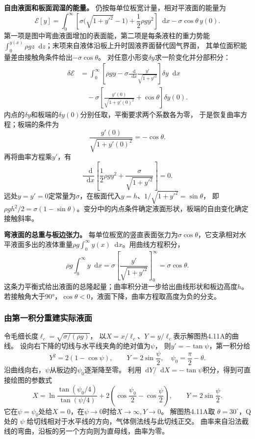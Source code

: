 \documentclass[UTF8,fontset=fandol,a4paper,11pt]{ctexart}
\newcommand{\dd}{\mathop{}\!\mathrm{d}}
\begin{document}
\textbf{自由液面和板面润湿的能量。} 仍按每单位板宽计量，相对平液面的能量为
\[
\mathcal E[y]=\int_0^\infty
\left[\sigma\bigl(\sqrt{1+y'^2}-1\bigr)+\frac12\rho gy^2\right]\dd x
-\sigma\cos\theta\,y(0).
\]
第一项是图中弯曲液面增加的表面能，第二项是每条液柱的重力势能
$\int_0^{y(x)}\rho gz\dd z$；末项来自液体沿板上升时固液界面替代固气界面，
其单位面积能量差由接触角条件给出$-\sigma\cos\theta$。
对任意小形变$\delta y$求一阶变化并分部积分：
\begin{align*}
\delta\mathcal E
&=\int_0^\infty\left[\rho gy-
\sigma\frac{\dd}{\dd x}\frac{y'}{\sqrt{1+y'^2}}\right]\delta y\dd x\\
&\quad-\sigma\left[\frac{y'(0)}{\sqrt{1+y'(0)^2}}+\cos\theta\right]\delta y(0).
\end{align*}
内点的$\delta y$和板端的$\delta y(0)$分别任取，平衡要求两个系数各为零，
于是恢复曲率方程；板端的条件为\[\frac{y'(0)}{\sqrt{1+y'(0)^2}}=-\cos\theta.\]
再将曲率方程乘$y'$，有
\[
\frac{\dd}{\dd x}\left[\frac12\rho gy^2+
\frac{\sigma}{\sqrt{1+y'^2}}\right]=0.
\]
远处$y=y'=0$定常量为$\sigma$，在板面代入$y=h$、$1/\sqrt{1+y'^2}=\sin\theta$，
即 $\rho gh^2/2=\sigma(1-\sin\theta)$。变分中的内点条件确定液面形状，板端的自由变化确定接触斜率。

\textbf{弯液面的总重与板边张力。} 每单位板宽的竖直表面张力为$\sigma\cos\theta$，它支承相对水平液面多出的液体重量$\rho g\int_0^\infty y(x)\dd x$。用曲线方程积分，
\[
\rho g\int_0^\infty y\dd x
=\sigma\left[\frac{y'}{\sqrt{1+y'^2}}\right]_{0}^{\infty}
=\sigma\cos\theta.
\]
这条力平衡式给出液面的总隆起量；曲率积分进一步给出曲线形状和板边高度$h$。若接触角大于90°，$\cos\theta<0$，液面下降，曲率方程取高度为负的分支。
\subsubsection*{由第一积分重建实际液面}
令毛细长度$\ell_c=\sqrt{\sigma/(\rho g)}$，
以$X=x/\ell_c$、$Y=y/\ell_c$表示解图热4.11A的曲线。
设向右下降的切线与水平线夹角的绝对值为$\psi$，
则$y'=-\tan\psi$，第一积分给
\[
Y^2=2(1-\cos\psi),\qquad Y=2\sin\frac\psi2,
\quad\psi_0=\frac\pi2-\theta.
\]
沿曲线向右，$\psi$从板边的$\psi_0$逐渐降至零。
利用$\dd Y/\dd X=-\tan\psi$积分，得到可直接绘图的参数式
\[
X=\ln\frac{\tan(\psi_0/4)}{\tan(\psi/4)}
+2\left(\cos\frac{\psi_0}{2}-\cos\frac\psi2\right),
\qquad Y=2\sin\frac\psi2.
\]
它在$\psi=\psi_0$处给$X=0$，在$\psi\to0$时给$X\to\infty,Y\to0$。
解图热4.11A取 $\theta=30^\circ$，Q处的 $\psi$ 给切线相对于水平线的方向，气体侧法线与此切线正交。
曲率来自沿法截线的弯曲，沿板的另一个方向则为直母线，曲率为零。
\end{document}
